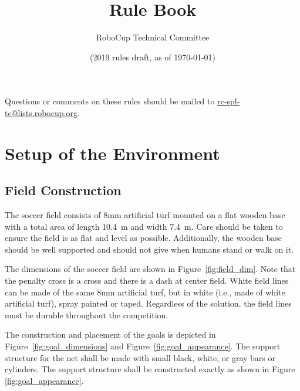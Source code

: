 \documentclass[12pt]{article}
\title{\leaguename Rule Book}
\author{RoboCup Technical Committee}
\date{(2019 rules draft, as of \today)}
\newcommand{\TotalWidth}{7.4~m\xspace}
\newcommand{\TotalLength}{10.4~m\xspace }
\begin{document}
\maketitle

\begin{center}
Questions or comments on these rules should be mailed to \url{rc-spl-tc@lists.robocup.org}.
\end{center}

\vfill

\tableofcontents
\setcounter{tocdepth}{3}

\thispagestyle{fancy}

\clearpage

\cfoot{\thepage}
\setcounter{page}{1}

\newpage

\section{Setup of the Environment}

\subsection{Field Construction}
\label{sec:field_dim}

The soccer field consists of 8mm artificial turf mounted on a flat wooden base with a total area of length \TotalLength and width \TotalWidth.  Care should be taken to ensure the field is as flat and level as possible.  Additionally, the wooden base should be well supported and should not give when humans stand or walk on it.

The dimensions of the soccer field are shown in Figure~\ref{fig:field_dim}. Note that the penalty cross is a cross and there is a dash at center field. White field lines can be made of the same 8mm artificial turf, but in white (i.e., made of white artificial turf), spray painted or taped. Regardless of the solution, the field lines must be durable throughout the competition.

The construction and placement of the goals is depicted in Figure~\ref{fig:goal_dimensions} and Figure~\ref{fig:goal_appearance}. The support structure for the net shall be made with small black, white, or gray bars or cylinders.  The support structure shall be constructed exactly as shown in Figure \ref{fig:goal_appearance}.
\end{document}
